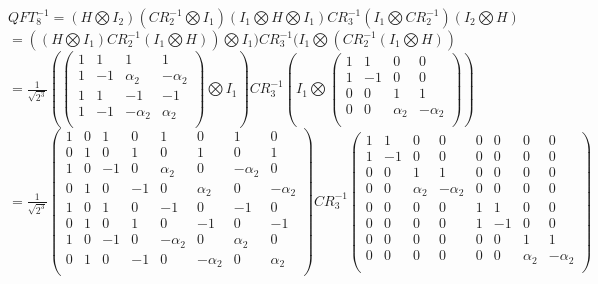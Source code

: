 \documentclass[a4paper]{scrartcl}
\begin{document}
\begin{enumerate}[a)]
$QFT_8^{-1}=(H\bigotimes I_2)(CR_2^{-1}\bigotimes I_1)(I_1\bigotimes H \bigotimes I_1)CR_3^{-1}(I_1 \bigotimes CR_2^{-1})(I_2 \bigotimes H)$\\
$=((H\bigotimes I_1)CR_2^{-1}(I_1\bigotimes H)) \bigotimes I_1)CR_3^{-1}(I_1 \bigotimes (CR_2^{-1}(I_1 \bigotimes H))$\\
$=\frac{1}{\sqrt{2^3}}(\begin{pmatrix} 1&1&1&1\\ 1&-1&\alpha_2&-\alpha_2\\ 1&1&-1&-1\\ 1&-1&-\alpha_2&\alpha_2\\\end{pmatrix} \bigotimes I_1) CR_3^{-1}(I_1 \bigotimes \begin{pmatrix}1&1&0&0\\ 1&-1&0&0\\ 0&0&1&1\\ 0&0&\alpha_2&-\alpha_2\\ \end{pmatrix})$\\
$=\frac{1}{\sqrt{2^3}}\begin{pmatrix}
1&0&1&0&1&0&1&0\\
0&1&0&1&0&1&0&1\\
1&0&-1&0&\alpha_2&0&-\alpha_2&0\\
0&1&0&-1&0&\alpha_2&0&-\alpha_2\\
1&0&1&0&-1&0&-1&0\\
0&1&0&1&0&-1&0&-1\\
1&0&-1&0&-\alpha_2&0&\alpha_2&0\\
0&1&0&-1&0&-\alpha_2&0&\alpha_2\\
\end{pmatrix}
CR_3^{-1}
\begin{pmatrix}
1&1&0&0&0&0&0&0\\
1&-1&0&0&0&0&0&0\\
0&0&1&1&0&0&0&0\\
0&0&\alpha_2&-\alpha_2&0&0&0&0\\
0&0&0&0&1&1&0&0\\
0&0&0&0&1&-1&0&0\\
0&0&0&0&0&0&1&1\\
0&0&0&0&0&0&\alpha_2&-\alpha_2\\
\end{pmatrix}$\\

\end{enumerate}

\newpage
\end{document}

